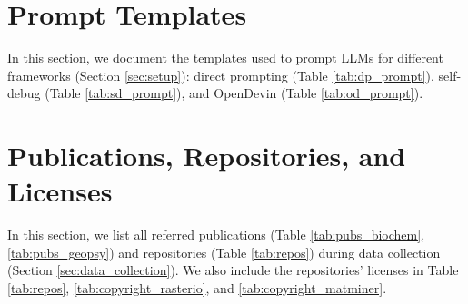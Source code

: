 

\newpage
\setcounter{table}{0}
\renewcommand\thetable{\Alph{section}.\arabic{table}}
\setcounter{figure}{0}
\renewcommand\thefigure{\Alph{section}.\arabic{figure}}


\section{Prompt Templates}
\label{app:prompts}

In this section, we document the templates used to prompt LLMs for different frameworks (Section \ref{sec:setup}): direct prompting (Table \ref{tab:dp_prompt}), self-debug (Table \ref{tab:sd_prompt}), and OpenDevin (Table \ref{tab:od_prompt}).



\quad
\newpage

\newpage
\setcounter{table}{0}
\renewcommand\thetable{\Alph{section}.\arabic{table}}
\setcounter{figure}{0}
\renewcommand\thefigure{\Alph{section}.\arabic{figure}}

\section{Publications, Repositories, and Licenses}
\label{app:repo_list}

In this section, we list all referred publications (Table \ref{tab:pubs_biochem}, \ref{tab:pubs_geopsy}) and repositories (Table \ref{tab:repos}) during data collection (Section \ref{sec:data_collection}).
We also include the repositories' licenses in Table \ref{tab:repos}, \ref{tab:copyright_rasterio}, and \ref{tab:copyright_matminer}.



